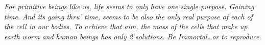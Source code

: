 \textit{For primitive beings like us, life seems to only have one single purpose. Gaining time.}
\textit{And its going thru’ time, seems to be also the only real purpose of each of the cell in our bodies.}
\textit{To achieve that aim, the mass of the cells that make up earth worm and human beings has only 2 solutions.}
\textit{Be Immortal…or to reproduce.}